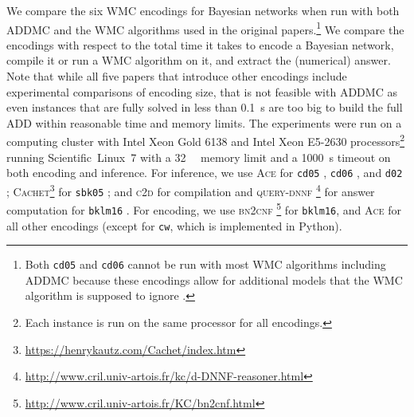 We compare the six WMC encodings for Bayesian networks when run with both
\textsc{ADDMC} \citep{DBLP:conf/aaai/DudekPV20} and the WMC algorithms used in
the original papers.\footnote{Both \texttt{cd05} and \texttt{cd06} cannot be run
  with most WMC algorithms including \textsc{ADDMC} because these encodings
  allow for additional models that the WMC algorithm is supposed to ignore
  \citep{DBLP:conf/ijcai/ChaviraD05,DBLP:conf/sat/ChaviraD06}.} We compare the
encodings with respect to the total time it takes to encode a Bayesian network,
compile it or run a WMC algorithm on it, and extract the (numerical) answer.
Note that while all five papers that introduce other encodings include
experimental comparisons of encoding size, that is not feasible with
\textsc{ADDMC} as even instances that are fully solved in less than
\SI{0.1}{\second} are too big to build the full ADD within reasonable time and
memory limits. The experiments were run on a computing cluster with Intel Xeon
Gold 6138 and Intel Xeon E5-2630 processors\footnote{Each instance is run on the
  same processor for all encodings.} running Scientific~Linux~7 with a
\SI{32}{\gibi\byte} memory limit and a \SI{1000}{\second} timeout on both
encoding and inference. For inference, we use \textsc{Ace} for \texttt{cd05}
\citep{DBLP:conf/ijcai/ChaviraD05}, \texttt{cd06}
\citep{DBLP:conf/sat/ChaviraD06}, and \texttt{d02}
\citep{DBLP:conf/kr/Darwiche02};
\textsc{Cachet}\footnote{\url{https://henrykautz.com/Cachet/index.htm}}
\citep{DBLP:conf/sat/SangBBKP04} for \texttt{sbk05}
\citep{DBLP:conf/aaai/SangBK05}; and \textsc{c2d}
\citep{DBLP:conf/ecai/Darwiche04} for compilation and \textsc{query-dnnf}
\footnote{\url{http://www.cril.univ-artois.fr/kc/d-DNNF-reasoner.html}} for
answer computation for \texttt{bklm16} \citep{DBLP:conf/ecai/BartKLM16}. For
encoding, we use \textsc{bn2cnf}
\footnote{\url{http://www.cril.univ-artois.fr/KC/bn2cnf.html}} for
\texttt{bklm16}, and \textsc{Ace} for all other encodings (except for
\texttt{cw}, which is implemented in Python).

